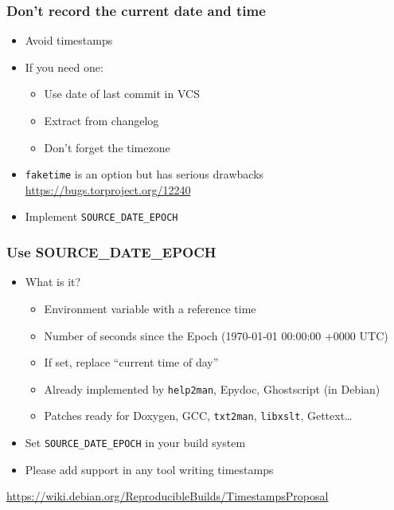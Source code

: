 \documentclass[14pt,aspectratio=169]{beamer}
\begin{document}
\begin{frame}
 \frametitle{Don't record the current date and time}

 \begin{itemize}
  \item Avoid timestamps
  \item<2-> If you need one:
    \begin{itemize}
      \item Use date of last commit in VCS
      \item Extract from changelog
      \item<3-> \alert{Don't forget the timezone}
    \end{itemize}
  \item<4-> \texttt{faketime} is an option but has serious drawbacks \\
    {\small \url{https://bugs.torproject.org/12240}}
  \item<5> Implement \texttt{SOURCE\_DATE\_EPOCH}
 \end{itemize}
\end{frame}

\begin{frame}
 \frametitle{Use SOURCE\_DATE\_EPOCH}

 \begin{itemize}
   \item What is it?
     \begin{itemize}
       \item Environment variable with a reference time
       \item Number of seconds since the Epoch (1970-01-01 00:00:00 +0000 UTC)
       \item If set, replace “current time of day”
       \item Already implemented by \texttt{help2man}, Epydoc, Ghostscript (in Debian)
       \item Patches ready for Doxygen, GCC, \texttt{txt2man}, \texttt{libxslt}, Gettext…
     \end{itemize}
   \item Set \texttt{SOURCE\_DATE\_EPOCH} in your build system
   \item Please add support in any tool writing timestamps
 \end{itemize}

 \begin{center}
   {\small \url{https://wiki.debian.org/ReproducibleBuilds/TimestampsProposal}}
 \end{center}
\end{frame}
\end{document}
